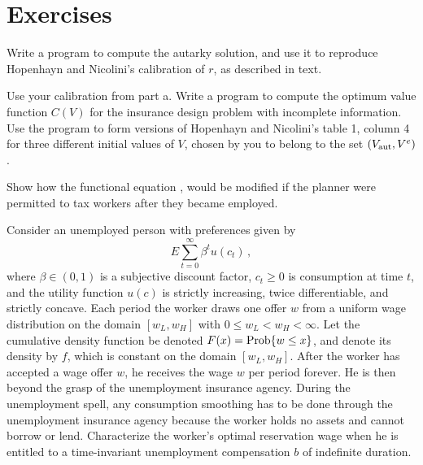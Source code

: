 \showchaptIDfalse
\showsectIDfalse
\section{Exercises}
\showchaptIDtrue
\showsectIDtrue
\medskip
{}

\medskip
{}   Write a program
to compute the autarky solution, and use it to  reproduce
Hopenhayn and Nicolini's calibration of  $r$, as described in text.

\medskip
{}  Use your calibration from part a.
  Write a program to compute the optimum value function $C(V)$ for the
insurance design problem with incomplete information. Use the program to
form versions of Hopenhayn and Nicolini's table 1, column 4 for three
different initial values of $V$, chosen by you to belong to the set
$(V_{\rm   aut}, V^e)$.

\medskip
{}  
\medskip
\noindent Show how the functional equation
,  would be modified if the planner
were permitted to tax workers after   they became employed.

\medskip
{}
\medskip
\noindent
Consider an unemployed person with preferences given by
$$
    E \sum_{t=0}^\infty \beta^t u(c_t)  \,,
$$
where $\beta \in (0,1)$ is a subjective discount factor, $c_t \geq 0$ is
consumption at time $t$, and the utility function
$u(c)$ is strictly increasing, twice differentiable,
and strictly concave. Each period the worker draws one offer $w$
from a uniform wage distribution on the domain
$[w_{\scriptscriptstyle L}, w_{\scriptscriptstyle H}]$
with $0 \leq w_{\scriptscriptstyle L} < w_{\scriptscriptstyle H} < \infty$.
Let the cumulative density function be denoted
$F(x)={\rm Prob}\{w\le x\}$, and denote its density by $f$,
which is constant on the domain
$[w_{\scriptscriptstyle L}, w_{\scriptscriptstyle H}]$.
After the worker has accepted a wage offer $w$, he receives the wage $w$
per period forever.  He is then beyond the grasp of the unemployment
insurance agency. During the unemployment spell, any consumption smoothing
has to be done through the unemployment insurance agency because the worker
holds no assets and cannot borrow or lend.
\medskip
{}   Characterize the worker's optimal reservation wage
when he is entitled to a time-invariant unemployment compensation $b$ of
indefinite duration.

